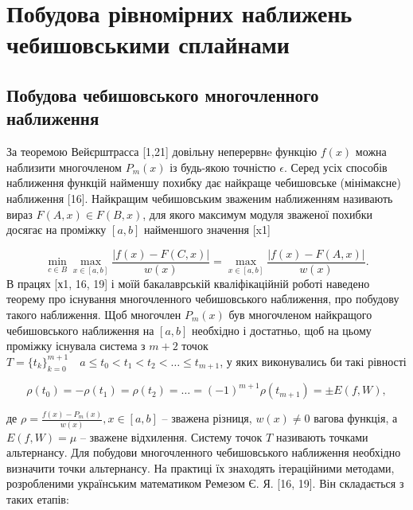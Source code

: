 \documentclass[ukrainian,14pt]{extarticle}
\begin{document}
\newpage


\section{Побудова рівномірних наближень чебишовськими сплайнами}
\subsection{Побудова чебишовського многочленного наближення}
За теоремою Вейєрштрасса [1,21] довільну неперервнe функцію $f(x)$  можна наблизити многочленом $P_m(x)$ із будь-якою точністю $\epsilon$. Серед усіх способів наближення функцій найменшу похибку дає найкраще чебишовське (мінімаксне) наближення [16]. Найкращим чебишовським зваженим наближенням називають вираз $F(A, x) \in F(B, x)$, для якого максимум модуля зваженої похибки досягає на проміжку $[a, b]$ найменшого значення [x1]

\begin{equation}\label{eq:formula1}
    \min_{c \in B} \max_{x \in [a,b]} \frac{|f(x) - F(C,x)|}{w(x)} = \max_{x \in [a,b]} \frac{|f(x) - F(A,x)|}{w(x)}.
\end{equation}
В працях [х1, 16, 19] і моїй бакалаврській кваліфікаційній роботі наведено теорему про існування многочленного чебишовського наближення, про побудову такого наближення. Щоб многочлен $P_m(x)$ був многочленом найкращого чебишовського наближення на $[a, b]$ необхідно і достатньо, щоб на цьому проміжку існувала система з $m+2$ точок $T=\{t_k\}_{k=0}^{m+1} \quad a \leq t_0 < t_1 < t_2 < \ldots \leq t_{m+1}$, у яких виконувались би такі рівності

\begin{equation}\label{eq:formula2}
    \rho(t_0) = -\rho(t_1) = \rho(t_2) = \ldots = (-1)^{m+1}\rho(t_{m+1}) = \pm E(f,W),

\end{equation}

де $\rho = \frac{f(x) - P_m(x)}{w(x)}, x \in [a, b]$  – зважена різниця, $w(x) \neq 0$ вагова функція, а $E(f,W) = \mu$ – зважене відхилення. Систему точок $T$ називають точками альтернансу. Для побудови многочленного чебишовського наближення необхідно визначити точки альтернансу. На практиці їх знаходять ітераційними методами, розробленими українським математиком Ремезом Є. Я. [16, 19]. Він складається з таких етапів:
\end{document}
